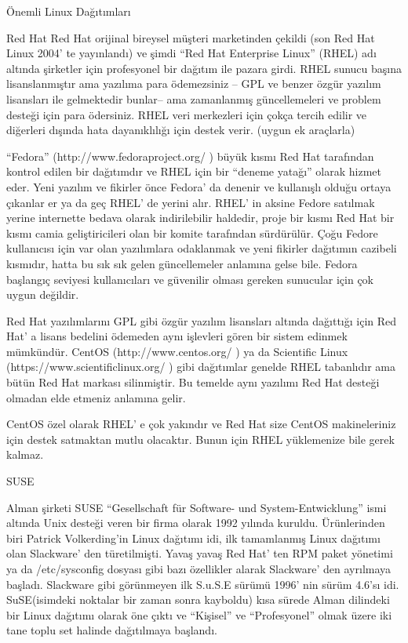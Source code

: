 \documentclass[10pt,a5paper]{book}
\begin{document}
\begin{section}{Önemli Linux Dağıtımları}
\begin{subsection}{Red Hat}
Red Hat orijinal bireysel müşteri marketinden çekildi (son Red Hat Linux 2004' te yayınlandı) ve şimdi “Red Hat Enterprise Linux” (RHEL) adı altında şirketler için profesyonel bir dağıtım ile pazara girdi. RHEL sunucu başına lisanslanmıştır ama yazılıma para ödemezsiniz – GPL ve benzer özgür yazılım lisansları ile gelmektedir bunlar-- ama zamanlanmış güncellemeleri ve problem desteği için para ödersiniz. RHEL veri merkezleri için çokça tercih edilir ve diğerleri dışında hata dayanıklılığı için destek verir. (uygun ek araçlarla)

“Fedora” (http://www.fedoraproject.org/ ) büyük kısmı Red Hat tarafından kontrol edilen bir dağıtımdır ve RHEL için bir “deneme yatağı” olarak hizmet eder. Yeni yazılım ve fikirler önce Fedora' da denenir ve kullanışlı olduğu ortaya çıkanlar er ya da geç RHEL' de yerini alır. RHEL' in aksine Fedore satılmak yerine internette bedava olarak indirilebilir haldedir, proje bir kısmı Red Hat bir kısmı camia geliştiricileri olan bir komite tarafından sürdürülür. Çoğu Fedore kullanıcısı için var olan yazılımlara odaklanmak ve yeni fikirler dağıtımın cazibeli kısmıdır, hatta bu sık sık gelen güncellemeler anlamına gelse bile. Fedora başlangıç seviyesi kullanıcıları ve güvenilir olması gereken sunucular için çok uygun değildir.

Red Hat yazılımlarını GPL gibi özgür yazılım lisansları altında dağıttığı için Red Hat' a lisans bedelini ödemeden aynı işlevleri gören bir sistem edinmek mümkündür. CentOS (http://www.centos.org/ ) ya da Scientific Linux (https://www.scientificlinux.org/ ) gibi dağıtımlar genelde RHEL tabanlıdır ama bütün Red Hat markası silinmiştir. Bu temelde aynı yazılımı Red Hat desteği olmadan elde etmeniz anlamına gelir.

CentOS özel olarak RHEL' e çok yakındır ve Red Hat size CentOS makineleriniz için destek satmaktan mutlu olacaktır. Bunun için RHEL yüklemenize bile gerek kalmaz.

\end{subsection}
\begin{subsection}{SUSE}

Alman şirketi SUSE “Gesellschaft für Software- und System-Entwicklung” ismi altında Unix desteği veren bir firma olarak 1992 yılında kuruldu. Ürünlerinden biri Patrick Volkerding’in Linux dağıtımı idi, ilk tamamlanmış Linux dağıtımı olan Slackware' den türetilmişti. Yavaş yavaş Red Hat' ten RPM paket yönetimi ya da /etc/sysconfig dosyası gibi bazı özellikler alarak Slackware' den ayrılmaya başladı. Slackware gibi görünmeyen ilk S.u.S.E sürümü 1996' nin sürüm 4.6'sı idi. SuSE(isimdeki noktalar bir zaman sonra kayboldu) kısa sürede Alman dilindeki bir Linux dağıtımı olarak öne çıktı ve “Kişisel” ve “Profesyonel” olmak üzere iki tane toplu set halinde dağıtılmaya başlandı.


\end{subsection}
\end{section}
\end{document}
